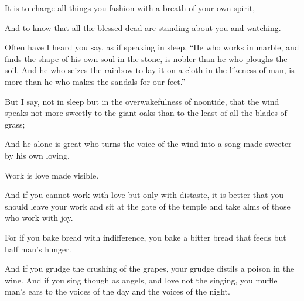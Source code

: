 It is to charge all things you fashion
with a breath of your own spirit,

And to know that all the blessed dead
are standing about you and watching.

Often have I heard you say, as if
speaking in sleep, “He who works in
marble, and finds the shape of his own
soul in the stone, is nobler than he who
ploughs the soil. And he who seizes
the rainbow to lay it on a cloth in the
likeness of man, is more than he who
makes the sandals for our feet.”

But I say, not in sleep but in the
overwakefulness of noontide, that the
wind speaks not more sweetly to the
giant oaks than to the least of all the
blades of grass;

And he alone is great who turns the
voice of the wind into a song made
sweeter by his own loving.



Work is love made visible.

And if you cannot work with love but
only with distaste, it is better that
you should leave your work and sit at
the gate of the temple and take alms of
those who work with joy.

For if you bake bread with indifference,
you bake a bitter bread that feeds but
half man’s hunger.

And if you grudge the crushing of the
grapes, your grudge distils a poison in
the wine. And if you sing though as
angels, and love not the singing, you
muffle man’s ears to the voices of the
day and the voices of the night.
